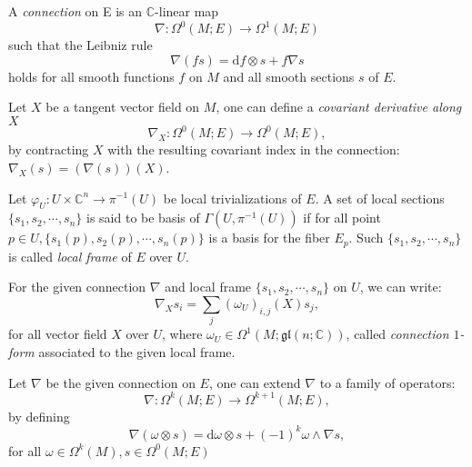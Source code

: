 \documentclass[11pt]{homework}
\theoremstyle{indented}
\begin{document}
\begin{definition}
    A \textit{connection} on E is an $\mathbb {C}$-linear map
    \begin{equation*}
        \nabla :\Omega^0(M;E)\to \Omega^1(M;E)
    \end{equation*}
    such that the Leibniz rule
    \begin{equation*}
        \nabla (fs)=\mathrm{d}f\otimes s+f\nabla s
    \end{equation*}
    holds for all smooth functions $f$ on $M$ and all smooth sections $s$ of $E$.

    Let $X$ be a tangent vector field on $M$, one can define a \textit{covariant derivative along} $X$
    \begin{equation*}
        \nabla _{X}:\Omega^{0}(M;E)\to \Omega^{0}(M;E),
    \end{equation*}
    by contracting $X$ with the resulting covariant index in the connection: $\nabla _{X}(s)=(\nabla (s))(X)$. 
\end{definition}

\begin{definition}
    Let $\varphi_U: U \times \mathbb{C}^n \to \pi^{-1}(U)$ be local trivializations of $E$. A set of local sections $\{s_1, s_2, \cdots, s_n\}$ is said to be basis of $\Gamma(U,\pi^{-1}(U))$ if for all point $p \in U, \{s_1(p), s_2(p), \cdots, s_n(p)\}$ is a basis for the fiber $E_p$. Such $\{s_1, s_2, \cdots, s_n\}$ is called \textit{local frame} of $E$ over $U$.
\end{definition}

\begin{definition}
    For the given connection $\nabla$ and local frame $\{s_1, s_2, \cdots, s_n\}$ on $U$, we can write:
    \begin{equation*}
        \nabla_X s_i = \sum_j \left(\omega_U\right)_{i,j}(X) s_j,
    \end{equation*}
    for all vector field $X$ over $U$, where $\omega_U \in \Omega^1(M;\mathfrak{gl}(n;\mathbb{C}))$, called \textit{connection $1$-form} associated to the given local frame.
\end{definition}
 
\begin{definition}
    Let $\nabla$ be the given connection on $E$, one can extend $\nabla$ to a family of operators:
    \begin{equation*}
        \nabla : \Omega^{k}(M;E)\to \Omega^{k+1}(M;E),
    \end{equation*}
    by defining
    \begin{equation*}
        \nabla (\omega \otimes s) = \mathrm{d} \omega \otimes s + (-1)^k \omega \wedge \nabla s,
    \end{equation*}
    for all $\omega \in \Omega^{k}(M), s\in \Omega^{0}(M;E)$
\end{definition}
\end{document}
